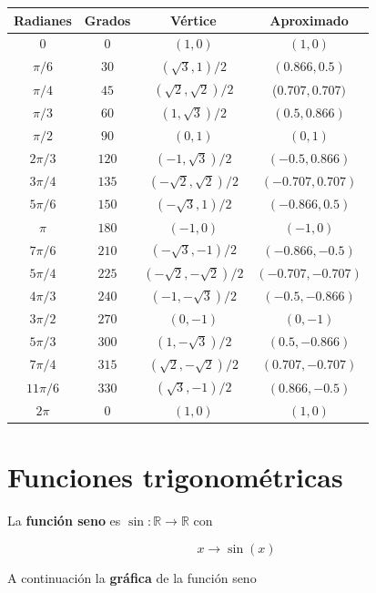 \begin{center}
  \begin{tabular}{| c | c | c | c | }
    \hline
    Radianes & Grados & Vértice & Aproximado \\ \hline \hline
    $0$ & $0$ & $(1,0)$ & $(1,0)$ \\ 
    $\pi/6$ & $30$ & $(\sqrt{3}, 1)/2$ & $(0.866, 0.5)$ \\
    $\pi/4$ & $45$ & $(\sqrt{2}, \sqrt{2})/2$ & ($0.707, 0.707)$ \\
    $\pi/3$ & $60$ & $(1, \sqrt{3})/2$ & $(0.5, 0.866)$ \\
    $\pi/2$ & $90$ & $(0, 1)$ & $(0, 1)$ \\
    $2\pi/3$ & $120$ & $(-1, \sqrt{3})/2$ & $(-0.5, 0.866)$ \\
    $3\pi/4$ & $135$ & $(-\sqrt{2}, \sqrt{2})/2$ & $(-0.707, 0.707)$ \\
    $5\pi/6$ & $150$ & $(-\sqrt{3}, 1)/2$ & $(-0.866, 0.5)$ \\
    $\pi$ & $180$ & $(-1, 0)$ & $(-1, 0)$ \\
    $7\pi/6$ & $210$ & $(-\sqrt{3}, -1)/2$ & $(-0.866, -0.5)$ \\
    $5\pi/4$ & $225$ & $(-\sqrt{2}, -\sqrt{2})/2$ & $(-0.707, -0.707)$ \\
    $4\pi/3$ & $240$ & $(-1, -\sqrt{3})/2$ & $(-0.5, -0.866)$ \\
    $3\pi/2$ & $270$ & $(0, -1)$ & $(0, -1)$ \\
    $5\pi/3$ & $300$ & $(1, -\sqrt{3})/2$ & $(0.5, -0.866)$ \\
    $7\pi/4$ & $315$ & $(\sqrt{2}, -\sqrt{2})/2$ & $(0.707, -0.707)$ \\
    $11\pi/6$ & $330$ & $(\sqrt{3}, -1)/2$ & $(0.866, -0.5)$ \\
    $2\pi$ & $0$ & $(1,0)$ & $(1,0)$ \\ 

    \hline
  \end{tabular}
\end{center}


\section{Funciones trigonométricas}

\begin{definition}[Seno] 
La \textbf{función seno} es $\sin : \mathbb{R} \to \mathbb{R}$ con 

$$ x \to \sin(x)$$

A continuación la \textbf{gráfica} de la función seno
\end{definition}

